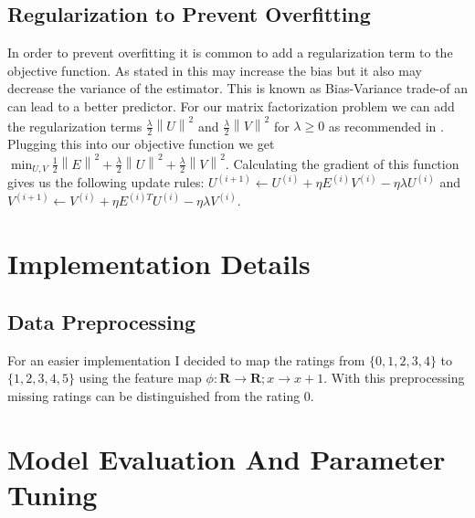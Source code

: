 \documentclass[DIV=12]{scrartcl}
\newcommand{\norm}[1]{\left\lVert#1\right\rVert}
\begin{document}
\subsection{Regularization to Prevent Overfitting}
In order to prevent overfitting it is common to add a regularization term to the objective function. As stated in \cite{Gi19} this may increase the bias but it also may decrease the variance of the estimator. This is known as Bias-Variance trade-of an can lead to a better predictor. For our matrix factorization problem we can  add the regularization terms $\frac{\lambda}{2}\norm{U}^2$ and $\frac{\lambda}{2}\norm{V}^2$ for $\lambda \geq 0$ as recommended in \cite{Ag16}.
Plugging this into our objective function we get $\min_{U,V} \frac{1}{2}\norm{E}^2 + \frac{\lambda}{2}\norm{U}^2 + \frac{\lambda}{2}\norm{V}^2$. Calculating the gradient of this function gives us the following update rules: $U^{(i+1)} \leftarrow U^{(i)} + \eta E^{(i)}V^{(i)} - \eta\lambda U^{(i)}$ and $V^{(i+1)} \leftarrow V^{(i)} + \eta E^{(i)T}U^{(i)} - \eta\lambda V^{(i)}$.

\section{Implementation Details}

\subsection{Data Preprocessing}
For an easier implementation I decided to map the ratings from $\{0,1,2,3,4\}$ to $\{1,2,3,4,5\}$ using the feature map $\phi:\mathbf{R}\rightarrow\mathbf{R};x\rightarrow x + 1$. With this preprocessing missing ratings can be distinguished from the rating 0.



\section{Model Evaluation And Parameter Tuning}

{}

\end{document}
